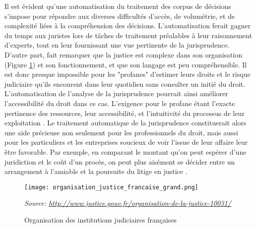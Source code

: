 Il est évident qu'une automatisation du traitement des corpus de décisions s'impose pour répondre aux diverses difficultés d'accès, de volumétrie, et de complexité liées à la compréhension des décisions. L'automatisation ferait gagner du temps aux juristes lors de tâches de traitement préalables à leur raisonnement d'experts, tout en leur fournissant une vue pertinente de la jurisprudence. D'autre part, \citet{cretin2014justicecomplexe} fait remarquer que la justice est complexe dans son organisation (Figure \ref{orgjusticefrance}) et son fonctionnement, et que son langage est peu compréhensible. Il est donc presque impossible pour les "profanes" d'estimer leurs droits et le risque judiciaire qu'ils encourent dans leur quotidien sans consulter un initié du droit. L'automatisation de l'analyse de la jurisprudence pourrait ainsi améliorer l'accessibilité du droit dans ce cas.  L'exigence pour le profane étant l'exacte pertinence des ressources, leur accessibilité, et l'intuitivité du processus de leur exploitation \citep{narazenko2017legalnlpintro}. Le traitement automatique de la jurisprudence constituerait alors une aide précieuse non seulement pour les professionnels du droit, mais aussi pour les particuliers et les entreprises soucieux de voir l'issue de leur affaire leur être favorable. Par exemple, en comparant le montant qu'on peut espérer d'une juridiction et le coût d'un procès, on peut plus aisément se décider entre un arrangement à l'amiable et la poursuite du litige en justice \citep{langlaischappe2009ecoresolutionlitige}. 

\begin{figure}[!htb]
	\centering \texttt{[image: organisation\_justice\_francaise\_grand.png]}
	
	\textit{\scriptsize{Source: \url{http://www.justice.gouv.fr/organisation-de-la-justice-10031/}}}  
	\caption{Organisation des institutions judiciaires françaises} \label{orgjusticefrance}
\end{figure}

